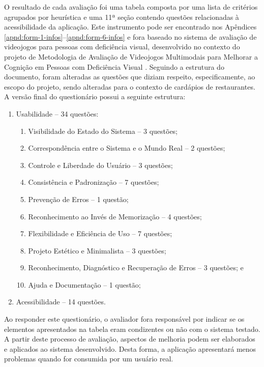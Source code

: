 O resultado de cada avaliação foi uma tabela composta por uma lista de critérios agrupados por heurística e uma 11ª seção contendo questões relacionadas à acessibilidade da aplicação. Este instrumento pode ser encontrado nos Apêndices \ref{apnd:form-1-infos}--\ref{apnd:form-6-infos} e fora baseado no sistema de avaliação de videojogos para pessoas com deficiência visual, desenvolvido no contexto do projeto de Metodologia de Avaliação de Videojogos Multimodais para Melhorar a Cognição em Pessoas com Deficiência Visual \cite{CAMPOS2015}. Seguindo a estrutura do documento, foram alteradas as questões que diziam respeito, especificamente, ao escopo do projeto, sendo alteradas para o contexto de cardápios de restaurantes. A versão final do questionário possui a seguinte estrutura:
\begin{enumerate}
	\item Usabilidade -- 34 questões:
	\begin{enumerate}[label*={\arabic*}]
		\item Visibilidade do Estado do Sistema -- 3 questões;
		\item Correspondência entre o Sistema e o Mundo Real -- 2 questões;
		\item Controle e Liberdade do Usuário -- 3 questões;
		\item Consistência e Padronização -- 7 questões;
		\item Prevenção de Erros -- 1 questão;
		\item Reconhecimento ao Invés de Memorização -- 4 questões;
		\item Flexibilidade e Eficiência de Uso -- 7 questões;
		\item Projeto Estético e Minimalista -- 3 questões;
		\item Reconhecimento, Diagnóstico e Recuperação de Erros -- 3 questões; e
		\item Ajuda e Documentação -- 1 questão;
	\end{enumerate}
	\item Acessibilidade -- 14 questões.
\end{enumerate}

Ao responder este questionário, o avaliador fora responsável por indicar se os elementos apresentados na tabela eram condizentes ou não com o sistema testado. A partir deste processo de avaliação, aspectos de melhoria podem ser elaborados e aplicados ao sistema desenvolvido. Desta forma, a aplicação apresentará menos problemas quando for consumida por um usuário real.

